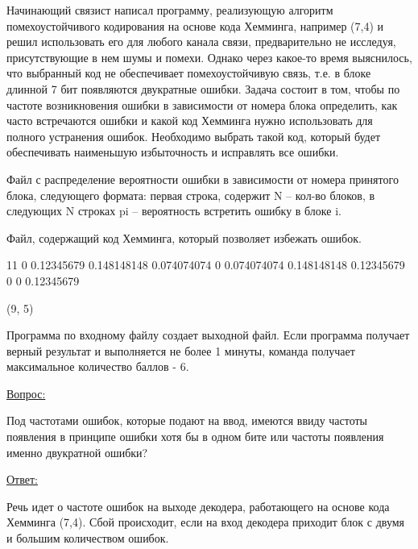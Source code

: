 
Начинающий связист написал программу, реализующую алгоритм помехоустойчивого кодирования на основе кода Хемминга, например (7,4) и решил использовать его для любого канала связи, предварительно не исследуя, присутствующие в нем шумы и помехи. Однако через какое-то время выяснилось, что выбранный код не обеспечивает помехоустойчивую связь, т.е. в блоке длинной 7 бит появляются двукратные ошибки. Задача состоит в том, чтобы по частоте возникновения ошибки в зависимости от номера блока определить, как часто встречаются ошибки и какой код Хемминга нужно использовать для полного устранения ошибок. Необходимо выбрать такой код, который будет обеспечивать наименьшую избыточность и исправлять все ошибки.


Файл с распределение вероятности ошибки в зависимости от номера принятого блока, следующего формата: первая строка, содержит N – кол-во блоков, в следующих N строках pi – вероятность встретить ошибку в блоке i.

\outputfmtSection

Файл, содержащий код Хемминга, который позволяет избежать ошибок.


\begin{myverbbox}[\small]{\vinput}
    11
    0
    0.12345679
    0.148148148
    0.074074074
    0
    0.074074074
    0.148148148
    0.12345679
    0
    0
    0.12345679    
\end{myverbbox}
\begin{myverbbox}[\small]{\voutput}
    (9, 5)
\end{myverbbox}

\markSection

Программа по входному файлу создает выходной файл. Если программа получает верный результат и выполняется не более 1 минуты, команда получает максимальное количество баллов - 6.

\commentsSection

\underline{Вопрос:} 

Под частотами ошибок, которые подают на ввод, имеются ввиду частоты появления в принципе ошибки хотя бы в одном бите или частоты появления именно двукратной ошибки?

\underline{Ответ:}

Речь идет о частоте ошибок на выходе декодера, работающего на основе кода Хемминга (7,4). Сбой происходит, если на вход декодера приходит блок с двумя и большим количеством ошибок.

